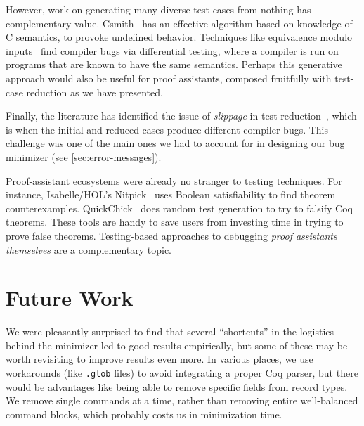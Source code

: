\documentclass[a4paper,USenglish,cleveref,autoref,thm-restate]{lipics-v2021}
\begin{document}
However, work on generating many diverse test cases from nothing has complementary value.
Csmith~\cite{yang2011finding} has an effective algorithm based on knowledge of C semantics, to provoke undefined behavior.
Techniques like equivalence modulo inputs~\cite{emi} find compiler bugs via differential testing, where a compiler is run on programs that are known to have the same semantics.
Perhaps this generative approach would also be useful for proof assistants, composed fruitfully with test-case reduction as we have presented.

Finally, the literature has identified the issue of \emph{slippage} in test reduction~\cite{chen2013taming,holmes2016mitigating}, which is when the initial and reduced cases produce different compiler bugs. This challenge was one of the main ones we had to account for in designing our bug minimizer (see \autoref{sec:error-messages}).

Proof-assistant ecosystems were already no stranger to testing techniques.
For instance, Isabelle/HOL's Nitpick~\cite{Nitpick} uses Boolean satisfiability to find theorem counterexamples.
QuickChick~\cite{quickchick} does random test generation to try to falsify Coq theorems.
These tools are handy to save users from investing time in trying to prove false theorems.
Testing-based approaches to debugging \emph{proof assistants themselves} are a complementary topic.


\section{Future Work}\label{sec:future-work}

We were pleasantly surprised to find that several ``shortcuts'' in the logistics behind the minimizer led to good results empirically, but some of these may be worth revisiting to improve results even more.
In various places, we use workarounds (like \texttt{.glob} files) to avoid integrating a proper Coq parser, but there would be advantages like being able to remove specific fields from record types.
We remove single commands at a time, rather than removing entire well-balanced command blocks, which probably costs us in minimization time.
\end{document}
